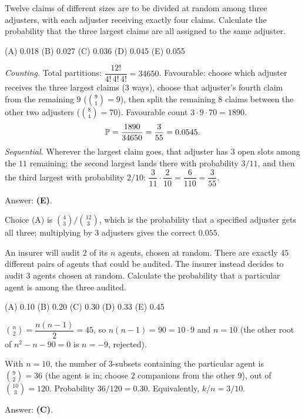 \begin{example}
Twelve claims of different sizes are to be divided at random among three adjusters, with each
adjuster receiving exactly four claims. Calculate the probability that the three largest
claims are all assigned to the same adjuster.
\par\smallskip\noindent (A) 0.018 \quad (B) 0.027 \quad (C) 0.036 \quad (D) 0.045 \quad (E) 0.055
\end{example}
\begin{solution}
\emph{Counting.} Total partitions: $\dfrac{12!}{4!\,4!\,4!} = 34650$. Favourable: choose which
adjuster receives the three largest claims ($3$ ways), choose that adjuster's fourth claim from
the remaining $9$ ($\binom{9}{1}=9$), then split the remaining $8$ claims between the other two
adjusters ($\binom{8}{4} = 70$). Favourable count $3\cdot 9\cdot 70 = 1890$.
\[
\mathbb{P} = \frac{1890}{34650} = \frac{3}{55} = 0.0545 .
\]
\emph{Sequential.} Wherever the largest claim goes, that adjuster has $3$ open slots among
the $11$ remaining; the second largest lands there with probability $3/11$, and then the
third largest with probability $2/10$: $\dfrac{3}{11}\cdot\dfrac{2}{10} = \dfrac{6}{110} = \dfrac{3}{55}$.

Answer: \textbf{(E)}.

Choice (A) is $\binom{4}{3}/\binom{12}{3}$, which is the probability that a specified adjuster
gets all three; multiplying by $3$ adjusters gives the correct $0.055$.
\end{solution}

\begin{example}
An insurer will audit $2$ of its $n$ agents, chosen at random. There are exactly $45$
different pairs of agents that could be audited. The insurer instead decides to audit $3$
agents chosen at random. Calculate the probability that a particular agent is among the three
audited.
\par\smallskip\noindent (A) 0.10 \quad (B) 0.20 \quad (C) 0.30 \quad (D) 0.33 \quad (E) 0.45
\end{example}
\begin{solution}
$\binom{n}{2} = \dfrac{n(n-1)}{2} = 45$, so $n(n-1) = 90 = 10\cdot 9$ and $n = 10$
(the other root of $n^2 - n - 90 = 0$ is $n=-9$, rejected).

With $n=10$, the number of $3$-subsets containing the particular agent is
$\binom{9}{2} = 36$ (the agent is in; choose $2$ companions from the other $9$), out of
$\binom{10}{3} = 120$. Probability $36/120 = 0.30$. Equivalently, $k/n = 3/10$.

Answer: \textbf{(C)}.
\end{solution}


